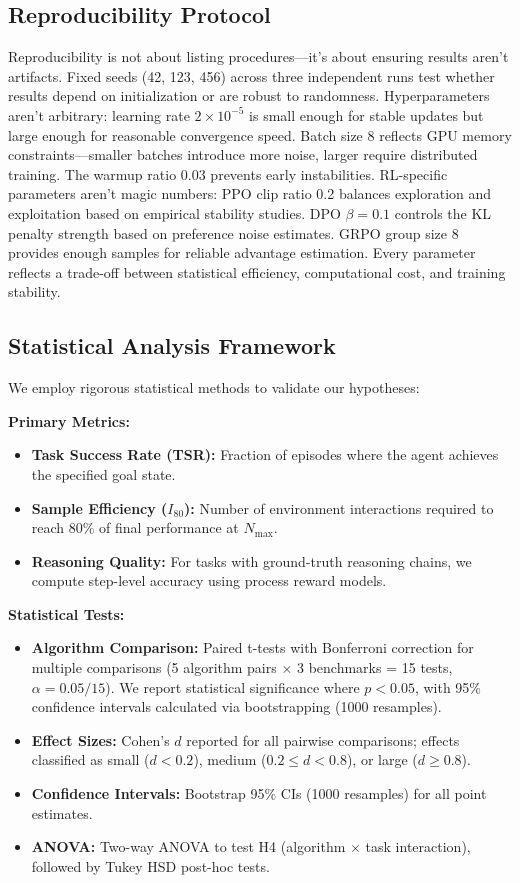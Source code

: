 \documentclass[12pt,a4paper]{report}
\theoremstyle{definition}
\begin{document}
\subsection{Reproducibility Protocol}
Reproducibility is not about listing procedures—it's about ensuring results aren't artifacts. Fixed seeds (42, 123, 456) across three independent runs test whether results depend on initialization or are robust to randomness. Hyperparameters aren't arbitrary: learning rate $2 \times 10^{-5}$ is small enough for stable updates but large enough for reasonable convergence speed. Batch size 8 reflects GPU memory constraints—smaller batches introduce more noise, larger require distributed training. The warmup ratio 0.03 prevents early instabilities. RL-specific parameters aren't magic numbers: PPO clip ratio 0.2 balances exploration and exploitation based on empirical stability studies. DPO $\beta = 0.1$ controls the KL penalty strength based on preference noise estimates. GRPO group size 8 provides enough samples for reliable advantage estimation. Every parameter reflects a trade-off between statistical efficiency, computational cost, and training stability.

\subsection{Statistical Analysis Framework}
We employ rigorous statistical methods to validate our hypotheses:

\textbf{Primary Metrics:}
\begin{itemize}
    \item \textbf{Task Success Rate (TSR):} Fraction of episodes where the agent achieves the specified goal state.
    \item \textbf{Sample Efficiency ($I_{80}$):} Number of environment interactions required to reach 80\% of final performance at $N_{\max}$.
    \item \textbf{Reasoning Quality:} For tasks with ground-truth reasoning chains, we compute step-level accuracy using process reward models.
\end{itemize}

\textbf{Statistical Tests:}
\begin{itemize}
    \item \textbf{Algorithm Comparison:} Paired t-tests with Bonferroni correction for multiple comparisons (5 algorithm pairs $\times$ 3 benchmarks = 15 tests, $\alpha = 0.05/15$). We report statistical significance where $p < 0.05$, with 95\% confidence intervals calculated via bootstrapping (1000 resamples).
    \item \textbf{Effect Sizes:} Cohen's $d$ reported for all pairwise comparisons; effects classified as small ($d < 0.2$), medium ($0.2 \leq d < 0.8$), or large ($d \geq 0.8$).
    \item \textbf{Confidence Intervals:} Bootstrap 95\% CIs (1000 resamples) for all point estimates.
    \item \textbf{ANOVA:} Two-way ANOVA to test H4 (algorithm $\times$ task interaction), followed by Tukey HSD post-hoc tests.
\end{itemize}
\end{document}
